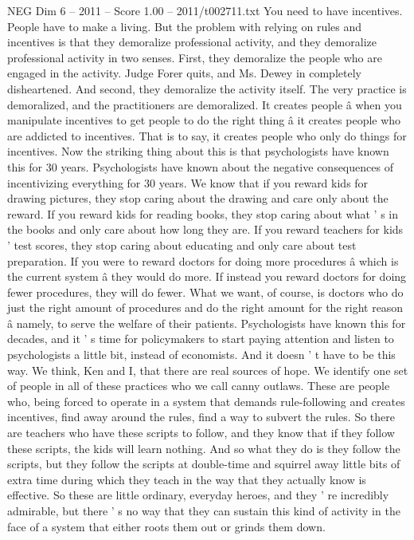 \begin{textsample}{NEG Dim 6 – 2011 – Score 1.00 – 2011/t002711.txt}
You need to have incentives.
People have to make a living.
But the problem with relying on rules and incentives is that they demoralize professional activity, and they demoralize professional activity in two senses.
First, they demoralize the people who are engaged in the activity.
Judge Forer quits, and Ms.
Dewey in completely disheartened.
And second, they demoralize the activity itself.
The very practice is demoralized, and the practitioners are demoralized.
It creates people â when you manipulate incentives to get people to do the right thing â it creates people who are addicted to incentives.
That is to say, it creates people who only do things for incentives.
Now the striking thing about this is that psychologists have known this for 30 years.
Psychologists have known about the negative consequences of incentivizing everything for 30 years.
We know that if you reward kids for drawing pictures, they stop caring about the drawing and care only about the reward.
If you reward kids for reading books, they stop caring about what ' s in the books and only care about how long they are.
If you reward teachers for kids ' test scores, they stop caring about educating and only care about test preparation.
If you were to reward doctors for doing more procedures â which is the current system â they would do more.
If instead you reward doctors for doing fewer procedures, they will do fewer.
What we want, of course, is doctors who do just the right amount of procedures and do the right amount for the right reason â namely, to serve the welfare of their patients.
Psychologists have known this for decades, and it ' s time for policymakers to start paying attention and listen to psychologists a little bit, instead of economists.
And it doesn ' t have to be this way.
We think, Ken and I, that there are real sources of hope.
We identify one set of people in all of these practices who we call canny outlaws.
These are people who, being forced to operate in a system that demands rule-following and creates incentives, find away around the rules, find a way to subvert the rules.
So there are teachers who have these scripts to follow, and they know that if they follow these scripts, the kids will learn nothing.
And so what they do is they follow the scripts, but they follow the scripts at double-time and squirrel away little bits of extra time during which they teach in the way that they actually know is effective.
So these are little ordinary, everyday heroes, and they ' re incredibly admirable, but there ' s no way that they can sustain this kind of activity in the face of a system that either roots them out or grinds them down.

\end{textsample}
